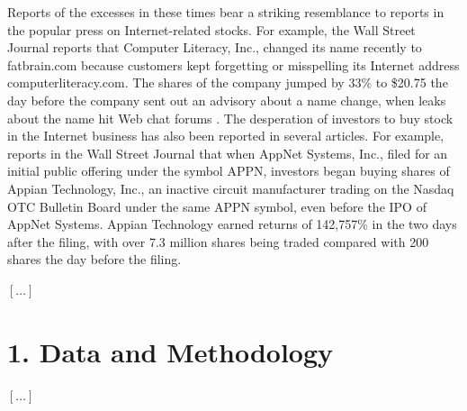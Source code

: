 \documentclass[12pt,a4paper]{article}
\begin{document}
Reports of the excesses in these times bear a striking resemblance to reports in the popular press on Internet-related stocks. For example, the Wall Street Journal reports that Computer Literacy, Inc., changed its name recently to fatbrain.com because customers kept forgetting or misspelling its Internet address computerliteracy.com. The shares of the company jumped by 33\% to \$20.75 the day before the company sent out an advisory about a name change, when leaks about the name hit Web chat forums \parencite{Wingfield1999}. The desperation of investors to buy stock in the Internet business has also been reported in several articles. For example, \textcite{Ewing1999} reports in the Wall Street Journal that when AppNet Systems, Inc., filed for an initial public offering under the symbol APPN, investors began buying shares of Appian Technology, Inc., an inactive circuit manufacturer trading on the Nasdaq OTC Bulletin Board under the same APPN symbol, even before the IPO of AppNet Systems. Appian Technology earned returns of 142,757\% in the two days after the filing, with over 7.3 million shares being traded compared with 200 shares the day before the filing.

$[\ldots]$

\section{1. Data and Methodology}

$[\ldots]$
\end{document}
